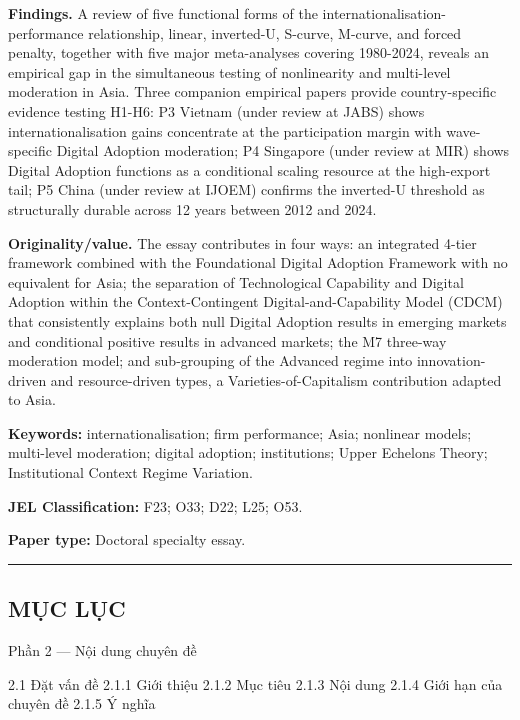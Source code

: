 \documentclass[12pt,a4paper]{article}
\begin{document}
\textbf{Findings.} A review of five functional forms of the
internationalisation-performance relationship, linear, inverted-U,
S-curve, M-curve, and forced penalty, together with five major
meta-analyses covering 1980-2024, reveals an empirical gap in the
simultaneous testing of nonlinearity and multi-level moderation in Asia.
Three companion empirical papers provide country-specific evidence
testing H1-H6: P3 Vietnam (under review at JABS) shows
internationalisation gains concentrate at the participation margin with
wave-specific Digital Adoption moderation; P4 Singapore (under review at
MIR) shows Digital Adoption functions as a conditional scaling resource
at the high-export tail; P5 China (under review at IJOEM) confirms the
inverted-U threshold as structurally durable across 12 years between
2012 and 2024.

\textbf{Originality/value.} The essay contributes in four ways: an
integrated 4-tier framework combined with the Foundational Digital
Adoption Framework with no equivalent for Asia; the separation of
Technological Capability and Digital Adoption within the
Context-Contingent Digital-and-Capability Model (CDCM) that consistently
explains both null Digital Adoption results in emerging markets and
conditional positive results in advanced markets; the M7 three-way
moderation model; and sub-grouping of the Advanced regime into
innovation-driven and resource-driven types, a Varieties-of-Capitalism
contribution adapted to Asia.

\textbf{Keywords:} internationalisation; firm performance; Asia;
nonlinear models; multi-level moderation; digital adoption;
institutions; Upper Echelons Theory; Institutional Context Regime
Variation.

\textbf{JEL Classification:} F23; O33; D22; L25; O53.

\textbf{Paper type:} Doctoral specialty essay.

\begin{center}\rule{0.5\linewidth}{0.5pt}\end{center}

\hypertarget{mux1ee5c-lux1ee5c}{%
\subsection{MỤC LỤC}\label{mux1ee5c-lux1ee5c}}

Phần 2 --- Nội dung chuyên đề

2.1 Đặt vấn đề 2.1.1 Giới thiệu 2.1.2 Mục tiêu 2.1.3 Nội dung 2.1.4 Giới
hạn của chuyên đề 2.1.5 Ý nghĩa
\end{document}
